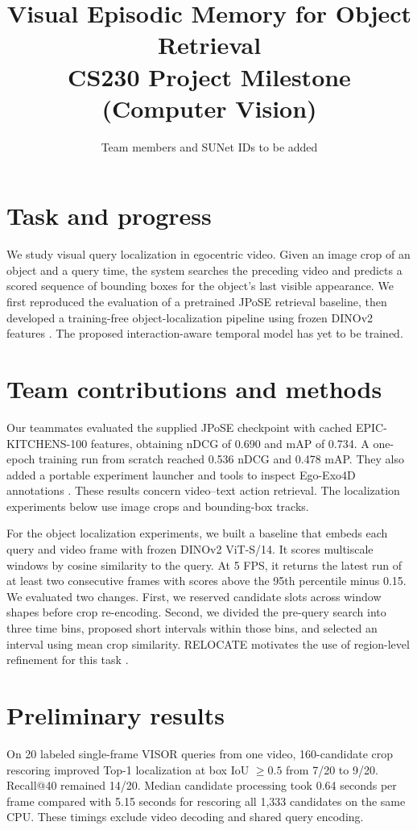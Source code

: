 \documentclass{article}
\title{Visual Episodic Memory for Object Retrieval\\[0.3em]\large CS230 Project Milestone (Computer Vision)}
\author{Team members and SUNet IDs to be added}
\begin{document}
\maketitle

\section{Task and progress}
We study visual query localization in egocentric video. Given an image crop of an object and a query time, the system searches the preceding video and predicts a scored sequence of bounding boxes for the object's last visible appearance. We first reproduced the evaluation of a pretrained JPoSE retrieval baseline, then developed a training-free object-localization pipeline using frozen DINOv2 features \citep{epic,dino}. The proposed interaction-aware temporal model has yet to be trained.

\section{Team contributions and methods}
Our teammates evaluated the supplied JPoSE checkpoint with cached EPIC-KITCHENS-100 features, obtaining nDCG of 0.690 and mAP of 0.734. A one-epoch training run from scratch reached 0.536 nDCG and 0.478 mAP. They also added a portable experiment launcher and tools to inspect Ego-Exo4D annotations \citep{repo}. These results concern video--text action retrieval. The localization experiments below use image crops and bounding-box tracks.

For the object localization experiments, we built a baseline that embeds each query and video frame with frozen DINOv2 ViT-S/14. It scores multiscale windows by cosine similarity to the query. At 5 FPS, it returns the latest run of at least two consecutive frames with scores above the 95th percentile minus 0.15. We evaluated two changes. First, we reserved candidate slots across window shapes before crop re-encoding. Second, we divided the pre-query search into three time bins, proposed short intervals within those bins, and selected an interval using mean crop similarity. RELOCATE motivates the use of region-level refinement for this task \citep{relocate}.

\section{Preliminary results}
On 20 labeled single-frame VISOR queries from one video, 160-candidate crop rescoring improved Top-1 localization at box IoU $\geq 0.5$ from 7/20 to 9/20. Recall@40 remained 14/20. Median candidate processing took 0.64 seconds per frame compared with 5.15 seconds for rescoring all 1,333 candidates on the same CPU. These timings exclude video decoding and shared query encoding.
\end{document}
